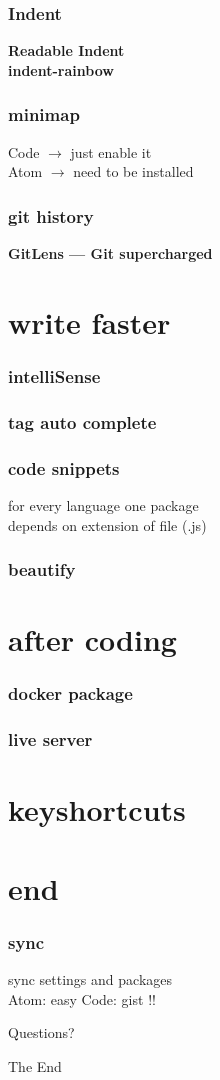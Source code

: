 \documentclass{beamer}
\begin{document}
\begin{frame}
\frametitle{Indent}
\textbf{Readable Indent}\\
\textbf{indent-rainbow}

\end{frame}

\begin{frame}
\frametitle{minimap}
Code $\rightarrow$ just enable it\\
Atom $\rightarrow$ need to be installed
\end{frame}

\begin{frame}
\frametitle{git history}
\textbf{GitLens — Git supercharged}
\end{frame}


\section{write faster}
\begin{frame}
\frametitle{intelliSense}
\end{frame}

\begin{frame}
\frametitle{tag auto complete}
\end{frame}

\begin{frame}
\frametitle{code snippets}
for every language one package\\
depends on extension of file (.js) 
\end{frame}

\begin{frame}
\frametitle{beautify}
\end{frame}


\section{after coding}
\begin{frame}
\frametitle{docker package}
\end{frame}

\begin{frame}
\frametitle{live server}
\end{frame}


\section{keyshortcuts}
\begin{frame}
\frametitle{}
\end{frame}

\begin{frame}
\frametitle{}
\end{frame}


\section{end}
\begin{frame}
\frametitle{sync}
sync settings and packages\\
Atom: easy
Code: gist !!
\end{frame}

\begin{frame}
\Huge{\centerline{Questions?}}
\end{frame}

\begin{frame}
\Huge{\centerline{The End}}
\end{frame}
\end{document}
